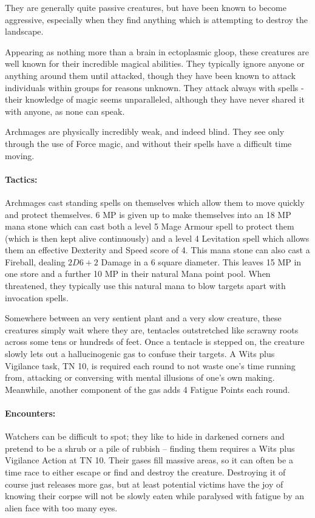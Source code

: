 They are generally quite passive creatures, but have been known to become aggressive, especially when they find anything which is attempting to destroy the landscape.

\label{archmage}

\archmage

Appearing as nothing more than a brain in ectoplasmic gloop, these creatures are well known for their incredible magical abilities.  They typically ignore anyone or anything around them until attacked, though they have been known to attack individuals within groups for reasons unknown.  They attack always with spells - their knowledge of magic seems unparalleled, although they have never shared it with anyone, as none can speak.

Archmages are physically incredibly weak, and indeed blind.  They see only through the use of Force magic, and without their spells have a difficult time moving.

\paragraph{Tactics:} Archmages cast standing spells on themselves which allow them to move quickly and protect themselves.  6 MP is given up to make themselves into an 18 MP mana stone which can cast both a level 5 Mage Armour spell to protect them (which is then kept alive continuously) and a level 4 Levitation spell which allows them an effective Dexterity and Speed score of 4.  This mana stone can also cast a Fireball, dealing $2D6+2$ Damage in a 6 square diameter.  This leaves 15 MP in one store and a further 10 MP in their natural Mana point pool.  When threatened, they typically use this natural mana to blow targets apart with invocation spells.

\label{watcher}
\watcher

Somewhere between an very sentient plant and a very slow creature, these creatures simply wait where they are, tentacles outstretched like scrawny roots across some tens or hundreds of feet.  Once a tentacle is stepped on, the creature slowly lets out a hallucinogenic gas to confuse their targets.  A Wits plus Vigilance task, TN 10, is required each round to not waste one's time running from, attacking or conversing with mental illusions of one's own making.  Meanwhile, another component of the gas adds 4 Fatigue Points each round.

\paragraph{Encounters:} Watchers can be difficult to spot; they like to hide in darkened corners and pretend to be a shrub or a pile of rubbish -- finding them requires a Wits plus Vigilance Action at TN 10.  Their gases fill massive areas, so it can often be a time race to either escape or find and destroy the creature.  Destroying it of course just releases more gas, but at least potential victims have the joy of knowing their corpse will not be slowly eaten while paralysed with fatigue by an alien face with too many eyes.

